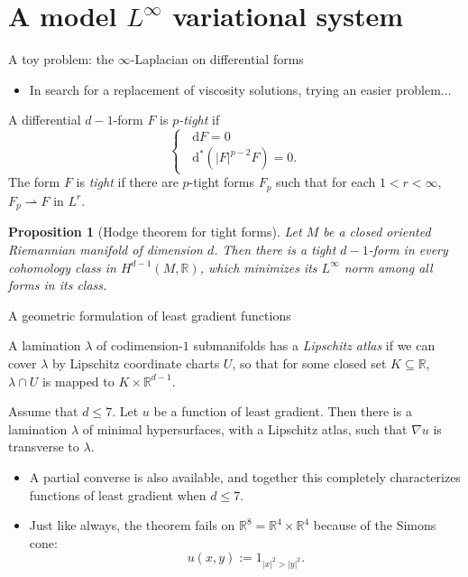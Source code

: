 \documentclass[10pt]{beamer}
\newcommand{\RR}{\mathbb{R}}
\newcommand*\dif{\mathop{}\!\mathrm{d}}
\newtheorem{proposition}{Proposition}
\begin{document}
\section{A model \texorpdfstring{$L^\infty$}{L-infinity} variational system}

\begin{frame}{A toy problem: the $\infty$-Laplacian on differential forms}
\begin{itemize}
\item In search for a replacement of viscosity solutions, trying an easier problem... \pause
\end{itemize}

\begin{definition}[B '24]
A differential $d - 1$-form $F$ is \emph{$p$-tight} if 
$$
\begin{cases}
    \dif F = 0 \\
    \dif^* (|F|^{p - 2} F) = 0.
\end{cases}$$
The form $F$ is \emph{tight} if there are $p$-tight forms $F_p$ such that for each $1 < r < \infty$, $F_p \rightharpoonup F$ in $L^r$. \pause
\end{definition}

\begin{proposition}[Hodge theorem for tight forms]
Let $M$ be a closed oriented Riemannian manifold of dimension $d$.
Then there is a tight $d - 1$-form in every cohomology class in $H^{d - 1}(M, \RR)$, which minimizes its $L^\infty$ norm among all forms in its class.
\end{proposition}
\end{frame}

\begin{frame}{A geometric formulation of least gradient functions}
\begin{definition}
A lamination $\lambda$ of codimension-$1$ submanifolds has a \emph{Lipschitz atlas} if we can cover $\lambda$ by Lipschitz coordinate charts $U$, so that for some closed set $K \subseteq \RR$, $\lambda \cap U$ is mapped to $K \times \RR^{d - 1}$. \pause
\end{definition}

\begin{theorem}[B '23]
Assume that $d \leq 7$.
Let $u$ be a function of least gradient.
Then there is a lamination $\lambda$ of minimal hypersurfaces, with a Lipschitz atlas, such that $\nabla u$ is transverse to $\lambda$. \pause
\end{theorem}

\begin{itemize}
\item A partial converse is also available, and together this completely characterizes functions of least gradient when $d \leq 7$. \pause
\item Just like always, the theorem fails on $\RR^8 = \RR^4 \times \RR^4$ because of the Simons cone:
$$u(x, y) := 1_{|x|^2 > |y|^2}.$$
\end{itemize}
    
\end{frame}
\end{document}
